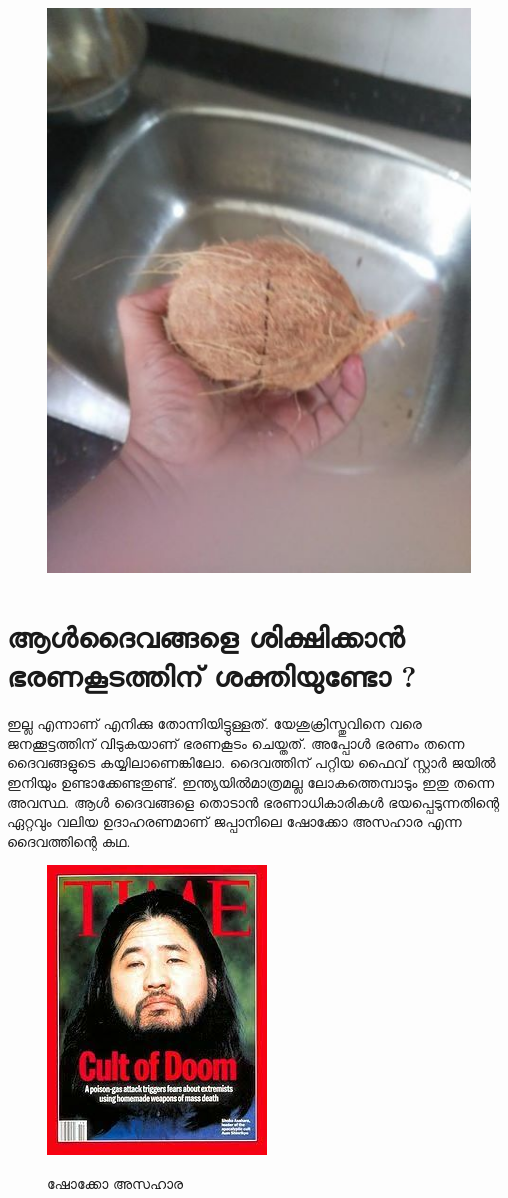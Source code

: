 \documentclass[10pt,a4paper]{report}
\begin{document}
      \begin{figure}[H]
  \center
\includegraphics[scale=.25]{images/t2} 
\label{t2}
\caption{  }
\end{figure}

\section{
ആൾദൈവങ്ങളെ ശിക്ഷിക്കാൻ ഭരണകൂടത്തിന് ശക്തിയുണ്ടോ ?}

 ഇല്ല എന്നാണ് എനിക്കു തോന്നിയിട്ടുള്ളത്. യേശുക്രിസ്തുവിനെ വരെ ജനക്കൂട്ടത്തിന് വിടുകയാണ് ഭരണകൂടം ചെയ്തത്. അപ്പോൾ ഭരണം തന്നെ ദൈവങ്ങളുടെ കയ്യിലാണെങ്കിലോ. ദൈവത്തിന് പറ്റിയ ഫൈവ് സ്റ്റാർ ജയിൽ ഇനിയും ഉണ്ടാക്കേണ്ടതുണ്ട്. ഇന്ത്യയിൽമാത്രമല്ല ലോകത്തെമ്പാടും ഇതു തന്നെ അവസ്ഥ. ആൾ ദൈവങ്ങളെ തൊടാൻ ഭരണാധികാരികൾ ഭയപ്പെടുന്നതിന്റെ ഏറ്റവും വലിയ ഉദാഹരണമാണ് ജപ്പാനിലെ ഷോക്കോ അസഹാര എന്ന ദൈവത്തിന്റെ കഥ. 
  \begin{figure}[H]
  \center
\includegraphics[scale=.45]{images/aal1} 
\label{aal1}
\caption{ ഷോക്കോ അസഹാര }
\end{figure}
\end{document}
